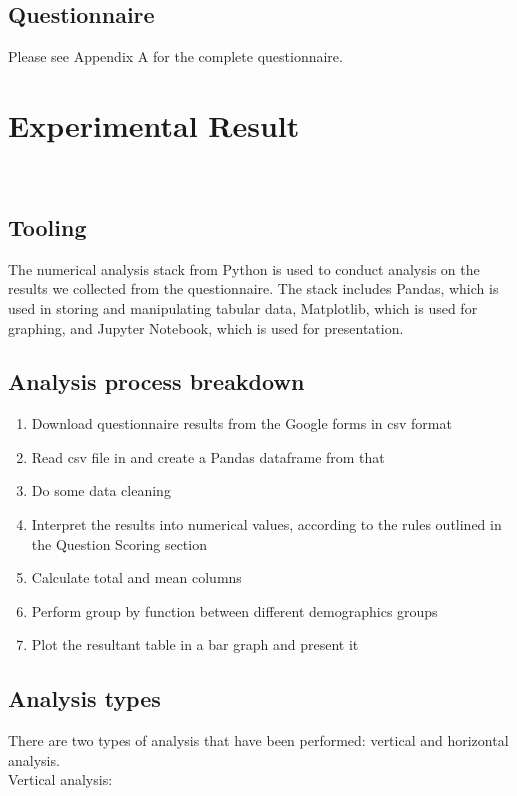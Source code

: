 \documentclass[12pt]{article}
\begin{document}
\subsection*{Questionnaire}
Please see Appendix A for the complete questionnaire.

\section*{Experimental Result}\

\subsection*{Tooling}
The numerical analysis stack from Python is used to conduct analysis on the results we collected from the questionnaire. The stack includes Pandas, which is used in storing and manipulating tabular data, Matplotlib, which is used for graphing, and Jupyter Notebook, which is used for presentation.

\subsection*{Analysis process breakdown}
\begin{enumerate}
  \item Download questionnaire results from the Google forms in csv format
  \item Read csv file in and create a Pandas dataframe from that
  \item Do some data cleaning
  \item Interpret the results into numerical values, according to the rules outlined in the Question Scoring section
  \item Calculate total and mean columns
  \item Perform group by function between different demographics groups
  \item Plot the resultant table in a bar graph and present it
\end{enumerate}

\subsection*{Analysis types}
There are two types of analysis that have been performed: vertical and horizontal analysis. \\
Vertical analysis:
\end{document}
